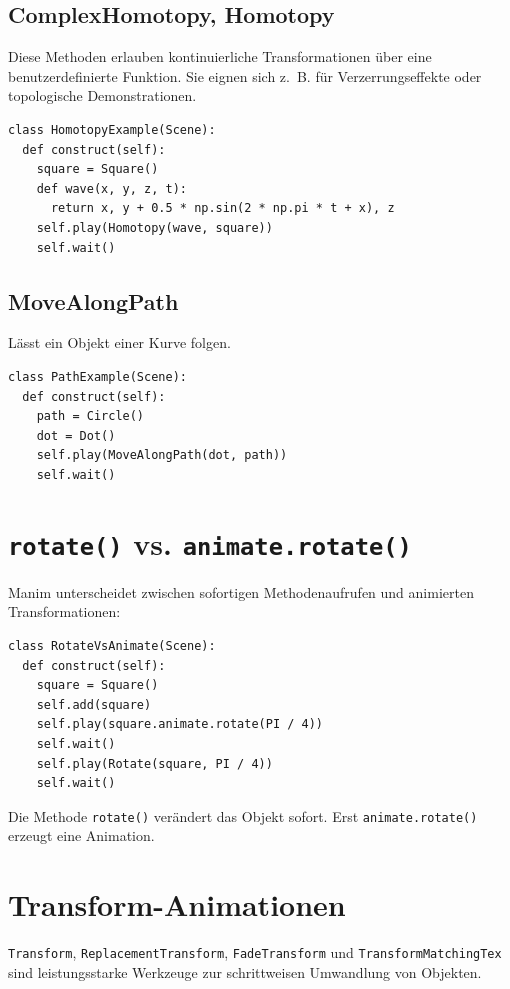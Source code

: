 \documentclass[12pt]{article}
\begin{document}
\subsection{ComplexHomotopy, Homotopy}
Diese Methoden erlauben kontinuierliche Transformationen über eine benutzerdefinierte Funktion. Sie eignen sich z.~B. für Verzerrungseffekte oder topologische Demonstrationen.

\begin{verbatim}
class HomotopyExample(Scene):
  def construct(self):
    square = Square()
    def wave(x, y, z, t):
      return x, y + 0.5 * np.sin(2 * np.pi * t + x), z
    self.play(Homotopy(wave, square))
    self.wait()
\end{verbatim}

\subsection{MoveAlongPath}
Lässt ein Objekt einer Kurve folgen.

\begin{verbatim}
class PathExample(Scene):
  def construct(self):
    path = Circle()
    dot = Dot()
    self.play(MoveAlongPath(dot, path))
    self.wait()
\end{verbatim}

\section{\texttt{rotate()} vs. \texttt{animate.rotate()}}
Manim unterscheidet zwischen sofortigen Methodenaufrufen und animierten Transformationen:

\begin{verbatim}
class RotateVsAnimate(Scene):
  def construct(self):
    square = Square()
    self.add(square)
    self.play(square.animate.rotate(PI / 4)) 
    self.wait()
    self.play(Rotate(square, PI / 4))
    self.wait()
\end{verbatim}

Die Methode \texttt{rotate()} verändert das Objekt sofort. Erst \texttt{animate.rotate()} erzeugt eine Animation.

\section{Transform-Animationen}
\texttt{Transform}, \texttt{ReplacementTransform}, \texttt{FadeTransform} und \texttt{TransformMatchingTex} sind leistungsstarke Werkzeuge zur schrittweisen Umwandlung von Objekten.
\end{document}
